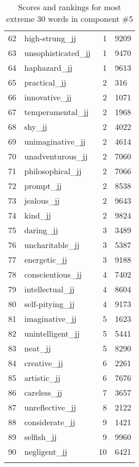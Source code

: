 \begin{longtable}[!htbp]{| rlr@{.}l |}
    62 & high-strung\_jj & 1 & 9209 \\
    63 & unsophisticated\_jj & 1 & 9470 \\
    64 & haphazard\_jj & 1 & 9613 \\
    65 & practical\_jj & 2 & 316 \\
    66 & innovative\_jj & 2 & 1071 \\
    67 & temperamental\_jj & 2 & 1968 \\
    68 & shy\_jj & 2 & 4022 \\
    69 & unimaginative\_jj & 2 & 4614 \\
    70 & unadventurous\_jj & 2 & 7060 \\
    71 & philosophical\_jj & 2 & 7066 \\
    72 & prompt\_jj & 2 & 8538 \\
    73 & jealous\_jj & 2 & 9643 \\
    74 & kind\_jj & 2 & 9824 \\
    75 & daring\_jj & 3 & 3489 \\
    76 & uncharitable\_jj & 3 & 5387 \\
    77 & energetic\_jj & 3 & 9188 \\
    78 & conscientious\_jj & 4 & 7402 \\
    79 & intellectual\_jj & 4 & 8604 \\
    80 & self-pitying\_jj & 4 & 9173 \\
    81 & imaginative\_jj & 5 & 1623 \\
    82 & unintelligent\_jj & 5 & 5441 \\
    83 & neat\_jj & 5 & 8290 \\
    84 & creative\_jj & 6 & 2261 \\
    85 & artistic\_jj & 6 & 7676 \\
    86 & careless\_jj & 7 & 3657 \\
    87 & unreflective\_jj & 8 & 2122 \\
    88 & considerate\_jj & 9 & 1421 \\
    89 & selfish\_jj & 9 & 9960 \\
    90 & negligent\_jj & 10 & 6421 \\
    \hline
    \caption{Scores and rankings for most extreme 30 words in component \#5} \\
\end{longtable}
